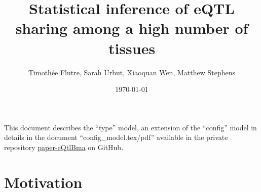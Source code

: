 \documentclass[10pt]{article}
\begin{document}
\title{Statistical inference of eQTL sharing among a high number of tissues}
\author{Timoth\'{e}e Flutre, Sarah Urbut, Xiaoquan Wen, Matthew Stephens}
\date{\today}

\maketitle


\vspace{1cm}

This document describes the ``type'' model, an extension of the ``config'' model in details in the document ``config\_model.tex/pdf'' available in the private repository \href{https://github.com/stephenslab/paper-eQtlBma}{paper-eQtlBma} on GitHub.



\section{Motivation}
\end{document}
